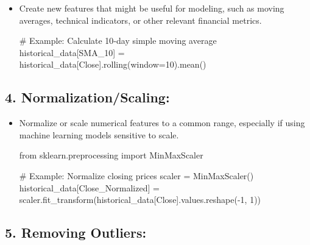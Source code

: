 \documentclass[
  letterpaper,
  DIV=11,
  numbers=noendperiod]{scrreprt}
\newenvironment{Shaded}{\begin{snugshade}}{\end{snugshade}}
\newcommand{\CommentTok}[1]{\textcolor[rgb]{0.37,0.37,0.37}{#1}}
\newcommand{\DecValTok}[1]{\textcolor[rgb]{0.68,0.00,0.00}{#1}}
\newcommand{\ImportTok}[1]{\textcolor[rgb]{0.00,0.46,0.62}{#1}}
\newcommand{\NormalTok}[1]{\textcolor[rgb]{0.00,0.23,0.31}{#1}}
\newcommand{\OperatorTok}[1]{\textcolor[rgb]{0.37,0.37,0.37}{#1}}
\newcommand{\StringTok}[1]{\textcolor[rgb]{0.13,0.47,0.30}{#1}}
\begin{document}
\begin{itemize}
\item
  Create new features that might be useful for modeling, such as moving
  averages, technical indicators, or other relevant financial metrics.

\begin{Shaded}
\begin{Highlighting}[]
\CommentTok{\# Example: Calculate 10{-}day simple moving average}
\NormalTok{historical\_data[}\StringTok{\textquotesingle{}SMA\_10\textquotesingle{}}\NormalTok{] }\OperatorTok{=}\NormalTok{ historical\_data[}\StringTok{\textquotesingle{}Close\textquotesingle{}}\NormalTok{].rolling(window}\OperatorTok{=}\DecValTok{10}\NormalTok{).mean()}
\end{Highlighting}
\end{Shaded}
\end{itemize}

\subsection{\texorpdfstring{4.
\textbf{Normalization/Scaling:}}{4. Normalization/Scaling:}}\label{normalizationscaling}

\begin{itemize}
\item
  Normalize or scale numerical features to a common range, especially if
  using machine learning models sensitive to scale.

\begin{Shaded}
\begin{Highlighting}[]
\ImportTok{from}\NormalTok{ sklearn.preprocessing }\ImportTok{import}\NormalTok{ MinMaxScaler}

\CommentTok{\# Example: Normalize closing prices}
\NormalTok{scaler }\OperatorTok{=}\NormalTok{ MinMaxScaler()}
\NormalTok{historical\_data[}\StringTok{\textquotesingle{}Close\_Normalized\textquotesingle{}}\NormalTok{] }\OperatorTok{=}\NormalTok{ scaler.fit\_transform(historical\_data[}\StringTok{\textquotesingle{}Close\textquotesingle{}}\NormalTok{].values.reshape(}\OperatorTok{{-}}\DecValTok{1}\NormalTok{, }\DecValTok{1}\NormalTok{))}
\end{Highlighting}
\end{Shaded}
\end{itemize}

\subsection{\texorpdfstring{5. \textbf{Removing
Outliers:}}{5. Removing Outliers:}}\label{removing-outliers}
\end{document}
